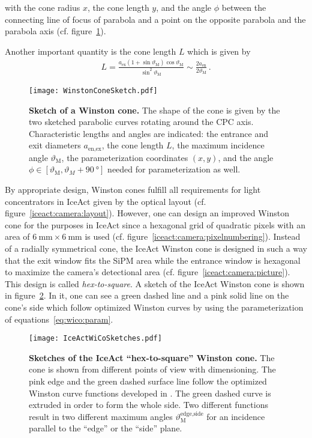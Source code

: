 with the cone radius $x$, the cone length $y$, and the angle $\phi$ between the connecting line of focus of parabola and a point on the opposite parabola and the parabola axis (cf. figure~\ref{iceact:camera:wico_sketch}).

Another important quantity is the cone length $L$ which is given by \cite{wico:book,iceact:camera}
\begin{align}
	L = \frac{a_\text{ex}(1+\sin\vartheta_\text{M})\cos\vartheta_\text{M}}{\sin^2\vartheta_\text{M}}\sim\frac{2a_\text{en}}{2\vartheta_\text{M}}\,.
\end{align}

\begin{figure}[H]
	\centering
	\texttt{[image: WinstonConeSketch.pdf]}
	\caption[Sketch of a Winston cone]{\textbf{Sketch of a Winston cone.} \cite{iceact:camera} The shape of the cone is given by the two sketched parabolic curves rotating around the CPC axis. Characteristic lengths and angles are indicated: the entrance and exit diameters $a_\text{en,ex}$, the cone length $L$, the maximum incidence angle $\vartheta_\text{M}$, the parameterization coordinates $(x,y)$, and the angle $\phi\in[\vartheta_\text{M},\vartheta_M+\SI{90}{\degree}]$ needed for parameterization as well.}
	\label{iceact:camera:wico_sketch}	
\end{figure}

By appropriate design, Winston cones fulfill all requirements for light concentrators in IceAct given by the optical layout (cf. figure~\ref{iceact:camera:layout}).
However, one can design an improved Winston cone for the purposes in IceAct since a hexagonal grid of quadratic pixels with an area of $\SI{6}{\milli\meter}\times\SI{6}{\milli\meter}$ is used (cf. figure~\ref{iceact:camera:pixelnumbering}). Instead of a radially symmetrical cone, the IceAct Winston cone is designed in such a way that the exit window fits the SiPM area while the entrance window is hexagonal to maximize the camera's detectional area (cf. figure~\ref{iceact:camera:picture}). This design is called \textit{hex-to-square}. A sketch of the IceAct Winston cone is shown in figure~\ref{iceact:camera:iceact_wico_sketch}. In it, one can see a green dashed line and a pink solid line on the cone's side which follow optimized Winston curves by using the parameterization of equations~\eqref{eq:wico:param}.

\begin{figure}[H]
	\centering
	\texttt{[image: IceActWiCoSketches.pdf]}
	\caption[Sketches of the IceAct \enquote{hex-to-square} Winston cone]{\textbf{Sketches of the IceAct \enquote{hex-to-square} Winston cone.} The cone is shown from different points of view with dimensioning. The pink edge and the green dashed surface line follow the optimized Winston curve functions developed in \cite{iceact:camera}. The green dashed curve is extruded in order to form the whole side. Two different functions result in two different maximum angles $\vartheta_\text{M}^\text{edge,side}$ for an incidence parallel to the \enquote{edge} or the \enquote{side} plane.}
	\label{iceact:camera:iceact_wico_sketch}	
\end{figure}

